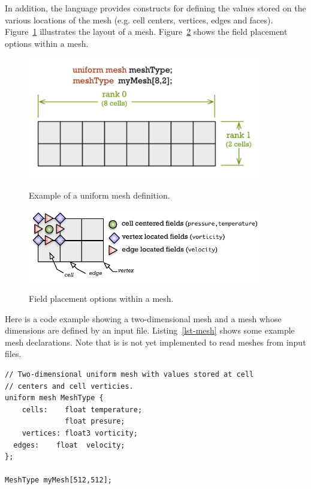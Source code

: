 
In addition, the language 
provides constructs for defining the values stored on the various locations of the mesh (e.g.
cell centers, vertices, edges and faces).  Figure~\ref{fig:types:mesh-def} illustrates the layout of a mesh.
Figure~\ref{fig:types:grid-positions} shows the field placement options within a mesh.

\par\bigskip
\begin{figure}[h]
  \centering
  \includegraphics[width=4.0in]{datatypes/figures/mesh-def.pdf} \\
  \caption{Example of a uniform mesh definition.}
  \label{fig:types:mesh-def}
\end{figure}



\begin{figure}[h]
  \centering
  \includegraphics[width=4.0in]{datatypes/figures/field-positions.pdf} \\
  \caption{Field placement options within a mesh.}
  \label{fig:types:grid-positions}
\end{figure}
\par\bigskip\noindent


Here is a code example showing a two-dimensional mesh and a mesh
whose dimensions are defined by an input file.
Listing~\ref{lst-mesh} shows some example mesh declarations.
Note that is is not yet implemented to read meshes from input files.

\par\bigskip
\begin{lstlisting}[float=h,label=lst-mesh,
    caption={Mesh declarations.}]
// Two-dimensional uniform mesh with values stored at cell 
// centers and cell verticies. 
uniform mesh MeshType {
	cells:    float temperature;
	          float presure;
	vertices: float3 vorticity;
  edges:    float  velocity;
};

MeshType myMesh[512,512];

\end{lstlisting}
\par\bigskip\noindent


